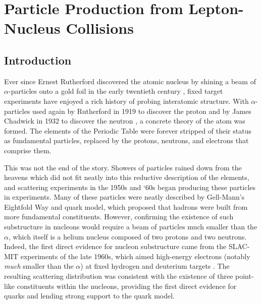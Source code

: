 \chapter{Particle Production from Lepton-Nucleus Collisions}
\label{upc}

\section{Introduction}

Ever since Ernest Rutherford discovered the atomic nucleus by shining a beam of $\alpha$-particles onto a gold foil in the early twentieth century \cite{Rutherford:1911zz}, fixed target experiments have enjoyed a rich history of probing interatomic structure. With $\alpha$-particles used again by Rutherford in 1919 to discover the proton \cite{FRS:1919nrm} and by James Chadwick in 1932 to discover the neutron \cite{Chadwick:1932wcf}, a concrete theory of the atom was formed. The elements of the Periodic Table were forever stripped of their status as fundamental particles, replaced by the protons, neutrons, and electrons that comprise them.

This was not the end of the story. Showers of particles rained down from the heavens which did not fit neatly into this reductive description of the elements, and scattering experiments in the 1950s and `60s began producing these particles in experiments. Many of these particles were neatly described by Gell-Mann's Eightfold Way and quark model, which proposed that hadrons were built from more fundamental constituents. However, confirming the existence of such substructure in nucleons would require a beam of particles much smaller than the $\alpha$, which itself is a helium nucleus composed of two protons and two neutrons. Indeed, the first direct evidence for nucleon substructure came from the SLAC-MIT experiments of the late 1960s, which aimed high-energy electrons (notably {\it much} smaller than the $\alpha$) at fixed hydrogen and deuterium targets \cite{Bloom:1969kc,Breidenbach:1969kd}.  The resulting scattering distribution was consistent with the existence of three point-like constituents within the nucleons, providing the first direct evidence for quarks and lending strong support to the quark model. 



